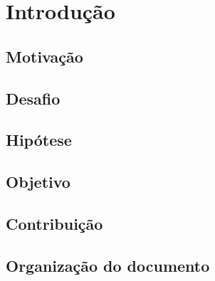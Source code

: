 \chapter{Introdução}


\section{Motivação}


\section{Desafio}


\section{Hipótese}


\section{Objetivo}


\section{Contribuição}


\section{Organização do documento}

